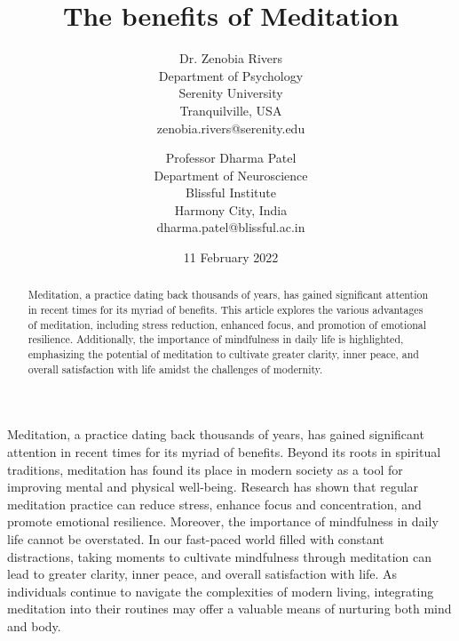 \documentclass{article}[12pt]
\begin{document}
 
	\date{11 February 2022}
	
	\title{The benefits of Meditation}
	
	
	\author{Dr. Zenobia Rivers\\
		Department of Psychology\\
		Serenity University\\
    	Tranquilville, USA\\
        zenobia.rivers@serenity.edu \and 
        Professor Dharma Patel \\
        Department of Neuroscience \\ 
        Blissful Institute \\
        Harmony City, India \\
        dharma.patel@blissful.ac.in
} 

    
	\maketitle
		
	\begin{abstract}
		Meditation, a practice dating back thousands of years, has gained significant attention in recent times for its myriad of benefits. This article explores the various advantages of meditation, including stress reduction, enhanced focus, and promotion of emotional resilience. Additionally, the importance of mindfulness in daily life is highlighted, emphasizing the potential of meditation to cultivate greater clarity, inner peace, and overall satisfaction with life amidst the challenges of modernity.  
	\end{abstract}

   Meditation, a practice dating back thousands of years, has gained significant attention in recent times for its myriad of benefits. Beyond its roots in spiritual traditions, meditation has found its place in modern society as a tool for improving mental and physical well-being. Research has shown that regular meditation practice can reduce stress, enhance focus and concentration, and promote emotional resilience. Moreover, the importance of mindfulness in daily life cannot be overstated. In our fast-paced world filled with constant distractions, taking moments to cultivate mindfulness through meditation can lead to greater clarity, inner peace, and overall satisfaction with life. As individuals continue to navigate the complexities of modern living, integrating meditation into their routines may offer a valuable means of nurturing both mind and  body. 
   
     
 
		
\end{document}

